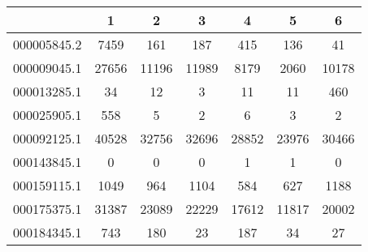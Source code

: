 \begin{adjustbox}{center}
\begin{tabular}{|l||c|c|c|c|c|c|}
\hline
& 1 & 2 & 3 & 4 & 5 & 6 \\
\hline
\hline
000005845.2 & \cellcolor[RGB]{235, 71, 71} 7459 & \cellcolor[RGB]{246, 246, 254} 161 & \cellcolor[RGB]{253, 241, 241} 187 & \cellcolor[RGB]{235, 71, 71} 415 & \cellcolor[RGB]{223, 223, 251} 136 & \cellcolor[RGB]{94, 94, 237} 41 \\
\hline
000009045.1 & \cellcolor[RGB]{235, 71, 71} 27656 & \cellcolor[RGB]{254, 246, 246} 11196 & \cellcolor[RGB]{252, 232, 232} 11989 & \cellcolor[RGB]{223, 223, 251} 8179 & \cellcolor[RGB]{94, 94, 237} 2060 & \cellcolor[RGB]{250, 250, 254} 10178 \\
\hline
000013285.1 & \cellcolor[RGB]{235, 71, 71} 34 & \cellcolor[RGB]{252, 232, 232} 12 & \cellcolor[RGB]{48, 48, 232} 3 & \cellcolor[RGB]{232, 232, 252} 11 & \cellcolor[RGB]{232, 232, 252} 11 & \cellcolor[RGB]{235, 71, 71} 460 \\
\hline
000025905.1 & \cellcolor[RGB]{235, 71, 71} 558 & \cellcolor[RGB]{253, 237, 237} 5 & \cellcolor[RGB]{227, 227, 252} 2 & \cellcolor[RGB]{251, 223, 223} 6 & \cellcolor[RGB]{241, 241, 253} 3 & \cellcolor[RGB]{227, 227, 252} 2 \\
\hline
000092125.1 & \cellcolor[RGB]{235, 71, 71} 40528 & \cellcolor[RGB]{253, 241, 241} 32756 & \cellcolor[RGB]{253, 241, 241} 32696 & \cellcolor[RGB]{227, 227, 252} 28852 & \cellcolor[RGB]{172, 172, 246} 23976 & \cellcolor[RGB]{241, 241, 253} 30466 \\
\hline
000143845.1 & \cellcolor[RGB]{255, 255, 255} 0 & \cellcolor[RGB]{255, 255, 255} 0 & \cellcolor[RGB]{255, 255, 255} 0 & \cellcolor[RGB]{235, 71, 71} 1 & \cellcolor[RGB]{235, 71, 71} 1 & \cellcolor[RGB]{255, 255, 255} 0 \\
\hline
000159115.1 & \cellcolor[RGB]{254, 250, 250} 1049 & \cellcolor[RGB]{250, 250, 254} 964 & \cellcolor[RGB]{253, 241, 241} 1104 & \cellcolor[RGB]{218, 218, 251} 584 & \cellcolor[RGB]{223, 223, 251} 627 & \cellcolor[RGB]{252, 232, 232} 1188 \\
\hline
000175375.1 & \cellcolor[RGB]{235, 71, 71} 31387 & \cellcolor[RGB]{252, 232, 232} 23089 & \cellcolor[RGB]{253, 241, 241} 22229 & \cellcolor[RGB]{223, 223, 251} 17612 & \cellcolor[RGB]{172, 172, 246} 11817 & \cellcolor[RGB]{246, 246, 254} 20002 \\
\hline
000184345.1 & \cellcolor[RGB]{235, 71, 71} 743 & \cellcolor[RGB]{252, 232, 232} 180 & \cellcolor[RGB]{232, 232, 252} 23 & \cellcolor[RGB]{252, 232, 232} 187 & \cellcolor[RGB]{232, 232, 252} 34 & \cellcolor[RGB]{232, 232, 252} 27 \\

\end{tabular}
\end{adjustbox}
